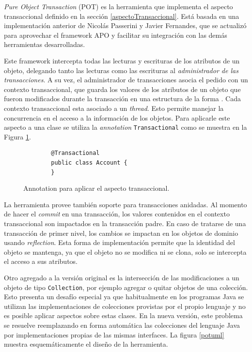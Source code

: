 \emph{Pure Object Transaction} (POT) es la herramienta que implementa el
aspecto transaccional definido en la sección \ref{aspectoTransaccional}.
Está basada en una implementación anterior de Nicolás Passerini y Javier
Fernandes, que se actualizó para aprovechar el framework APO y facilitar su
integración con las demás herramientas desarrolladas.

\medskip
 
Este framework intercepta todas las lecturas y escrituras de los atributos de
un objeto, delegando tanto las lecturas como las escrituras al
\emph{administrador de las transacciones}.
A su vez, el administrador de transacciones asocia el pedido con un contexto
transaccional, que guarda los valores de los atributos de un objeto que fueron
modificados durante la transacción en una estructura de la forma
.
Cada contexto transaccional esta asociado a un \emph{thread}. Esto
permite manejar la concurrencia en el acceso a la información de los objetos.
Para aplicarle este aspecto a una clase se utiliza la \emph{annotation} \lstinline|Transactional| como
se muestra en la Figura \ref{annoTransactional}.

\begin{figure}[hbt]
	\begin{lstlisting} 
		@Transactional
		public class Account {
		}
	\end{lstlisting}
	\caption{Annotation para aplicar el aspecto transaccional.}
	\label{annoTransactional}
\end{figure}
	
\medskip
 
La herramienta provee también soporte para transacciones anidadas.
Al momento de hacer el \emph{commit} en una transacción, los valores
contenidos en el contexto transaccional son impactados en la transacción
padre.
En caso de tratarse de una transacción de primer nivel, los cambios se impactan
en los objetos de dominio usando \emph{reflection}.
Esta forma de implementación permite que la identidad del objeto se
mantenga, ya que el objeto no se modifica ni se clona, solo se intercepta el
acceso a sus atributos.

Otro agregado a la versión original es la intersección de las modificaciones 
a un objeto de tipo \lstinline|Collection|, por ejemplo agregar o quitar
objetos de una colección.
Esto presenta un desafío especial ya que habitualmente en los programas Java
se utilizan las implementaciones de colecciones provistas por el propio
lenguaje y no es posible aplicar aspectos sobre estas clases. 
En la nueva versión, este problema se resuelve reemplazando en forma
automática las colecciones del lenguaje Java por
implementaciones propias de las mismas interfaces.
La figura \ref{potuml} muestra esquemáticamente el diseño de la herramienta.

